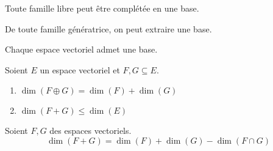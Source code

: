 \begin{theorem}
	Toute famille libre peut être complétée en une base.
\end{theorem}

\begin{theorem}
    De toute famille génératrice, on peut extraire une base.
\end{theorem}

\begin{theorem}
    Chaque espace vectoriel admet une base.
\end{theorem}

\begin{proposition}
	Soient $E$ un espace vectoriel et $F, G\subseteq E$.
	\begin{multicols}{2}
	    \begin{enumerate}
    		\item $\dim(F \oplus G) = \dim(F) + \dim(G)$ 
    		\item $\dim(F + G) \leq \dim(E)$
    	\end{enumerate}
	\end{multicols}
\end{proposition}

\begin{theorem}
	Soient $F, G$ des espaces vectoriels.
	\[ \dim(F+G) = \dim(F) + \dim(G) - \dim(F\cap G) \]
\end{theorem}

